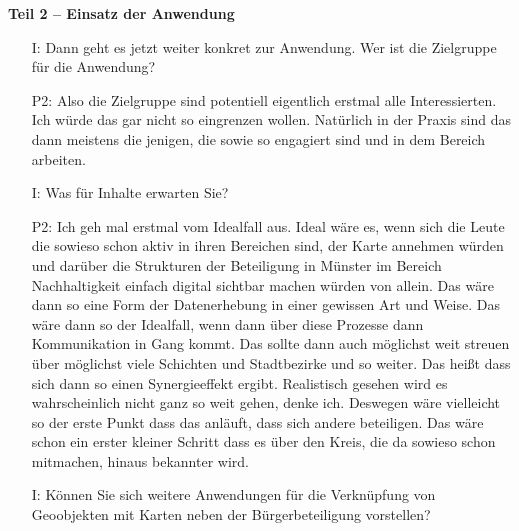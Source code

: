 \textbf{Teil 2 -- Einsatz der Anwendung}
\begin{itemize}
    \item[I:] Dann geht es jetzt weiter konkret zur Anwendung. Wer ist die Zielgruppe f{\"u}r die Anwendung?
    \item[P2:] Also die Zielgruppe sind potentiell eigentlich erstmal alle Interessierten. Ich w{\"u}rde das gar nicht so eingrenzen wollen. Nat{\"u}rlich in der Praxis sind das dann meistens die jenigen, die sowie so engagiert sind und in dem Bereich arbeiten.
    \item[I:] Was f{\"u}r Inhalte erwarten Sie?
    \item[P2:] Ich geh mal erstmal vom Idealfall aus. Ideal w{\"a}re es, wenn sich die Leute die sowieso schon aktiv in ihren Bereichen sind, der Karte annehmen w{\"u}rden und dar{\"u}ber die Strukturen der Beteiligung in M{\"u}nster im Bereich Nachhaltigkeit einfach digital sichtbar machen w{\"u}rden von allein. Das w{\"a}re dann so eine Form der Datenerhebung in einer gewissen Art und Weise. Das w{\"a}re dann so der Idealfall, wenn dann {\"u}ber diese Prozesse dann Kommunikation in Gang kommt. Das sollte dann auch m{\"o}glichst weit streuen {\"u}ber m{\"o}glichst viele Schichten und Stadtbezirke und so weiter. Das hei{\ss}t dass sich dann so einen Synergieeffekt ergibt. Realistisch gesehen wird es wahrscheinlich nicht ganz so weit gehen, denke ich. Deswegen w{\"a}re vielleicht so der erste Punkt dass das anl{\"a}uft, dass sich andere beteiligen. Das w{\"a}re schon ein erster kleiner Schritt dass es {\"u}ber den Kreis, die da sowieso schon mitmachen, hinaus bekannter wird.
    \item[I:] K{\"o}nnen Sie sich weitere Anwendungen f{\"u}r die Verkn{\"u}pfung von Geoobjekten mit Karten neben der B{\"u}rgerbeteiligung vorstellen?

\end{itemize}
